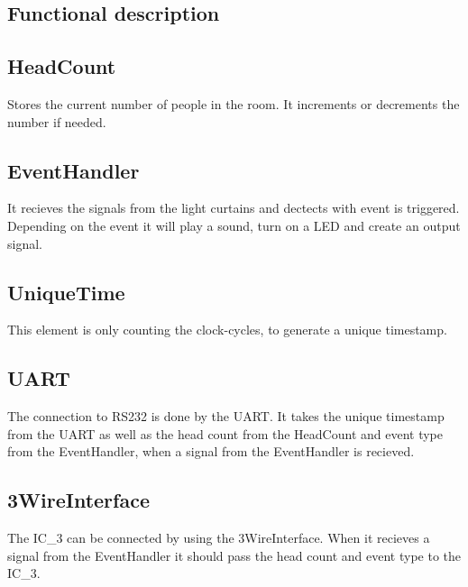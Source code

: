 \documentclass[12pt,a4 paper] {article}
\begin{document}
\subsection{Functional description}
\subsection*{HeadCount}
Stores the current number of people in the room. It increments or decrements the number if needed.
\subsection*{EventHandler}
It recieves the signals from the light curtains and dectects with event is triggered. Depending on the event it will play a sound, turn on a LED and create an output signal.
\subsection*{UniqueTime}
This element is only counting the clock-cycles, to generate a unique timestamp. \newpage
\subsection*{UART}
The connection to RS232 is done by the UART. It takes the unique timestamp from the UART as well as the head count from the HeadCount and event type from the EventHandler, when a signal from the EventHandler is recieved.
\subsection*{3WireInterface}
The IC\_3 can be connected by using the 3WireInterface. When it recieves a signal from the EventHandler it should pass the head count and event type to the IC\_3.
\end{document}
